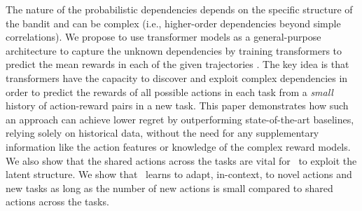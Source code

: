 %
The nature of the probabilistic dependencies depends on the specific structure of the bandit and can be complex (i.e., higher-order dependencies beyond simple correlations).  
%
We propose to use transformer models as a general-purpose architecture to capture the unknown dependencies by training transformers to predict the mean rewards in each of the given trajectories \citep{mirchandani2023large, zhao2023expel}.  The key idea is that transformers have the capacity to discover and exploit complex dependencies in order to predict the rewards of all possible actions in each task from a \emph{small} history of action-reward pairs in a new task. 
%
This paper demonstrates how such an approach can achieve lower regret by outperforming state-of-the-art baselines, relying solely on historical data, without the need for any supplementary information like the action features or knowledge of the complex reward models. 
%
We also show that the shared actions across the tasks are vital for \pred\ to exploit the latent structure.  
%
We show that \pred\ learns to adapt, in-context, to novel actions and new tasks as long as the number of new actions is small compared to shared actions across the tasks.
%

